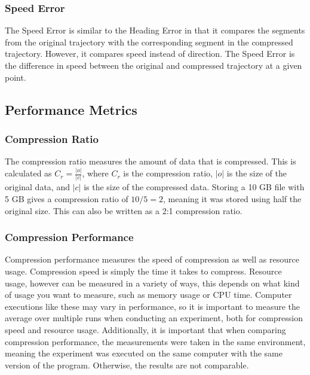 \subsubsection{Speed Error}
The Speed Error is similar to the Heading Error in that it compares the segments from the original trajectory with the corresponding segment in the compressed trajectory. However, it compares speed instead of direction. The Speed Error is the difference in speed between the original and compressed trajectory at a given point.

\subsection{Performance Metrics}
\subsubsection{Compression Ratio}
The compression ratio measures the amount of data that is compressed. This is calculated as $C_{r} = \frac{|o|}{|c|}$, where $C_{r}$ is the compression ratio, $|o|$ is the size of the original data, and $|c|$ is the size of the compressed data. Storing a 10 GB file with 5 GB gives a compression ratio of $10 / 5 = 2$, meaning it was stored using half the original size. This can also be written as a 2:1 compression ratio.

\subsubsection{Compression Performance}
Compression performance measures the speed of compression as well as resource usage. Compression speed is simply the time it takes to compress. Resource usage, however can be measured in a variety of ways, this depends on what kind of usage you want to measure, such as memory usage or CPU time. Computer executions like these may vary in performance, so it is important to measure the average over multiple runs when conducting an experiment, both for compression speed and resource usage. Additionally, it is important that when comparing compression performance, the measurements were taken in the same environment, meaning the experiment was executed on the same computer with the same version of the program. Otherwise, the results are not comparable.

